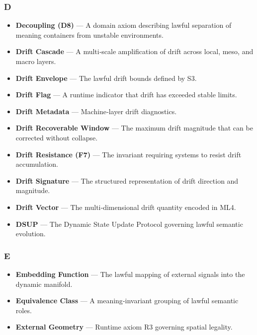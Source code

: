 \subsubsection*{D}
\begin{itemize}
    \item \textbf{Decoupling (D8)} — A domain axiom describing lawful separation
    of meaning containers from unstable environments.

    \item \textbf{Drift Cascade} — A multi‑scale amplification of drift across
    local, meso, and macro layers.

    \item \textbf{Drift Envelope} — The lawful drift bounds defined by S3.

    \item \textbf{Drift Flag} — A runtime indicator that drift has exceeded
    stable limits.

    \item \textbf{Drift Metadata} — Machine‑layer drift diagnostics.

    \item \textbf{Drift Recoverable Window} — The maximum drift magnitude that
    can be corrected without collapse.

    \item \textbf{Drift Resistance (F7)} — The invariant requiring systems to
    resist drift accumulation.

    \item \textbf{Drift Signature} — The structured representation of drift
    direction and magnitude.

    \item \textbf{Drift Vector} — The multi‑dimensional drift quantity encoded in
    ML4.

    \item \textbf{DSUP} — The Dynamic State Update Protocol governing lawful
    semantic evolution.
\end{itemize}


\subsubsection*{E}
\begin{itemize}
    \item \textbf{Embedding Function} — The lawful mapping of external signals
    into the dynamic manifold.

    \item \textbf{Equivalence Class} — A meaning‑invariant grouping of lawful
    semantic roles.

    \item \textbf{External Geometry} — Runtime axiom R3 governing spatial
    legality.
\end{itemize}


